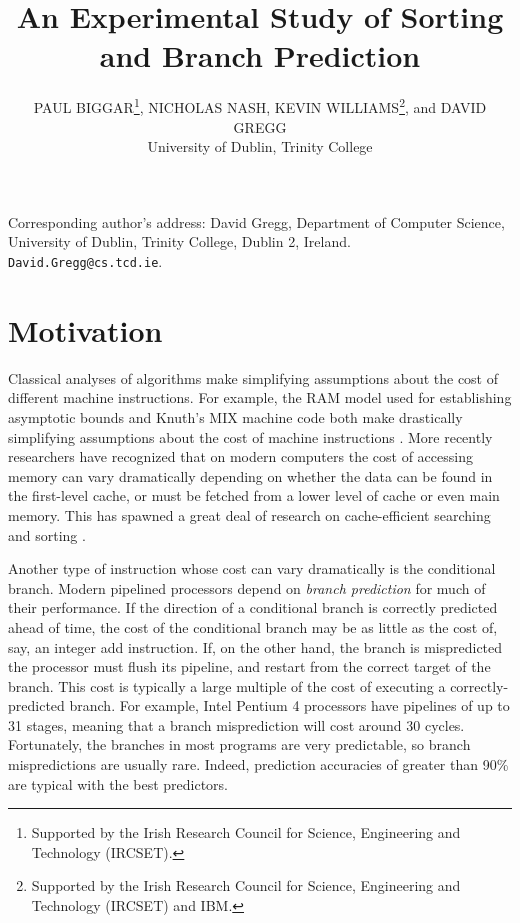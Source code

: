 \documentclass[acmtocl]{acmtrans2m}
\title{An Experimental Study of Sorting and Branch Prediction}
\author{
PAUL BIGGAR\footnote[1]{Supported by the Irish Research Council for Science,
Engineering and Technology (IRCSET).}, NICHOLAS NASH\footnotemark[1], KEVIN
WILLIAMS\footnote[2]{Supported by the Irish Research Council for Science,
Engineering and Technology (IRCSET) and IBM.}, and DAVID GREGG \\University of
Dublin, Trinity College
}
\begin{document}
\begin{bottomstuff}
Corresponding author's address: David Gregg, Department of Computer
Science, University of Dublin, Trinity College, Dublin 2, Ireland. {\tt
David.Gregg@cs.tcd.ie}.
\end{bottomstuff}

\maketitle

\section{Motivation}
Classical analyses of algorithms make simplifying assumptions about the cost of
different machine instructions. For example, the RAM model used for establishing
asymptotic bounds and Knuth's MIX machine code both make drastically simplifying
assumptions about the cost of machine instructions \cite{KnuthVol1_97}. More
recently researchers have recognized that on modern computers the cost of
accessing memory can vary dramatically depending on whether the data can be
found in the first-level cache, or must be fetched from a lower level of cache
or even main memory.  This has spawned a great deal of research on
cache-efficient searching and sorting
\cite{Nyberg+94,Agarwal96,LaMarca96b,LaMarca96a,LaMarca97,Xiao+00,Rahman+01,Wickremesinghe+02}.

Another type of instruction whose cost can vary dramatically is the conditional
branch. Modern pipelined processors depend on \emph{branch prediction} for much
of their performance.  If the direction of a conditional branch is correctly
predicted ahead of time, the cost of the conditional branch may be as little as
the cost of, say, an integer add instruction. If, on the other hand, the branch
is mispredicted the processor must flush its pipeline, and restart from the
correct target of the branch. This cost is typically a large multiple of the
cost of executing a correctly-predicted branch. For example, Intel Pentium 4
processors \cite{Intel248966-010,Intel249438-01} have pipelines of up to 31
stages, meaning that a branch misprediction will cost around 30 cycles.
Fortunately, the branches in most programs are very predictable, so branch
mispredictions are usually rare. Indeed, prediction accuracies of greater than
90\% are typical \cite{Uht+97} with the best predictors.
\end{document}
